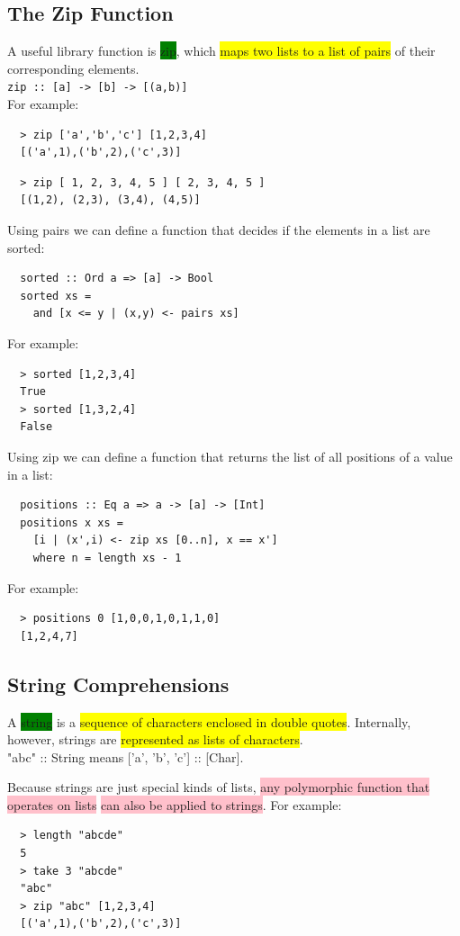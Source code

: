 \documentclass[tikz,border=10pt]{project_plan}
\begin{document}
\subsection{The Zip Function}

A useful library function is \colorbox{green}{zip}, which \colorbox{yellow}{maps two lists to a list
  of pairs} of their corresponding elements.\\
\lstinline|zip :: [a] -> [b] -> [(a,b)]|\\
For example:
\begin{lstlisting}
  > zip ['a','b','c'] [1,2,3,4]
  [('a',1),('b',2),('c',3)]
\end{lstlisting}

\begin{lstlisting}
  > zip [ 1, 2, 3, 4, 5 ] [ 2, 3, 4, 5 ]
  [(1,2), (2,3), (3,4), (4,5)]
\end{lstlisting}

Using pairs we can define a function that decides if the
elements in a list are sorted:
\begin{lstlisting}
  sorted :: Ord a => [a] -> Bool
  sorted xs =
    and [x <= y | (x,y) <- pairs xs]
\end{lstlisting}
For example:
\begin{lstlisting}
  > sorted [1,2,3,4]
  True
  > sorted [1,3,2,4]
  False
\end{lstlisting}

Using zip we can define a function that returns the list of all
positions of a value in a list:
\begin{lstlisting}
  positions :: Eq a => a -> [a] -> [Int]
  positions x xs =
    [i | (x',i) <- zip xs [0..n], x == x']
    where n = length xs - 1
\end{lstlisting}
For example:
\begin{lstlisting}
  > positions 0 [1,0,0,1,0,1,1,0]
  [1,2,4,7]
\end{lstlisting}

\subsection{String Comprehensions}

A \colorbox{green}{string} is a \colorbox{yellow}{sequence of characters enclosed in double
  quotes}. Internally, however, strings are \colorbox{yellow}{represented as lists of characters}.\\
"abc" :: String means ['a', 'b', 'c'] :: [Char].

Because strings are just special kinds of lists, \colorbox{pink}{any
  polymorphic function that operates on lists} \colorbox{pink}{can also be
  applied to strings}. For example:
\begin{lstlisting}
  > length "abcde"
  5
  > take 3 "abcde"
  "abc"
  > zip "abc" [1,2,3,4]
  [('a',1),('b',2),('c',3)]
\end{lstlisting}
\end{document}
